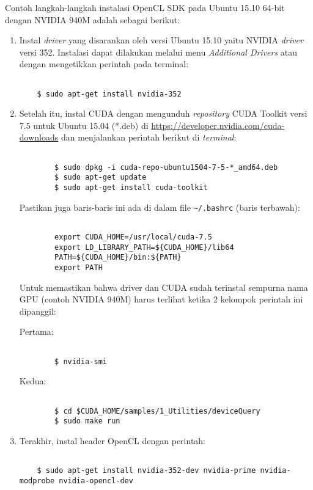 Contoh langkah-langkah instalasi OpenCL SDK pada Ubuntu 15.10 64-bit dengan NVIDIA 940M adalah sebagai berikut:

\begin{enumerate}
	\item Instal \textit{driver} yang disarankan oleh versi Ubuntu 15.10 yaitu NVIDIA \textit{driver} versi 352. Instalasi dapat dilakukan melalui menu \textit{Additional Drivers} atau dengan mengetikkan perintah pada terminal:
	
	\begin{lstlisting}
		
	$ sudo apt-get install nvidia-352
	\end{lstlisting}
	
	\item Setelah itu, instal CUDA dengan mengunduh \textit{repository} CUDA Toolkit versi 7.5 untuk Ubuntu 15.04 (*.deb) di \url{https://developer.nvidia.com/cuda-downloads} dan menjalankan perintah berikut di \textit{terminal}:  
	
	\begin{lstlisting}
	
		$ sudo dpkg -i cuda-repo-ubuntu1504-7-5-*_amd64.deb
		$ sudo apt-get update
		$ sudo apt-get install cuda-toolkit
	\end{lstlisting}
	Pastikan juga baris-baris ini ada di dalam file \verb|~/.bashrc| (baris terbawah):
	
	\begin{lstlisting}
	
		export CUDA_HOME=/usr/local/cuda-7.5 
		export LD_LIBRARY_PATH=${CUDA_HOME}/lib64 
		PATH=${CUDA_HOME}/bin:${PATH} 
		export PATH	
	\end{lstlisting}
	
	Untuk memastikan bahwa driver dan CUDA sudah terinstal sempurna nama GPU (contoh NVIDIA 940M) harus terlihat ketika 2 kelompok perintah ini dipanggil:
	
	Pertama:
	
	\begin{lstlisting}
	
		$ nvidia-smi
	\end{lstlisting}
	
	Kedua:
	
	\begin{lstlisting}
	
		$ cd $CUDA_HOME/samples/1_Utilities/deviceQuery
		$ sudo make run		
	\end{lstlisting}
	
	\item Terakhir, instal header OpenCL dengan perintah:
	
	\begin{lstlisting}
	
	$ sudo apt-get install nvidia-352-dev nvidia-prime nvidia-modprobe nvidia-opencl-dev
	\end{lstlisting}
	
\end{enumerate}

